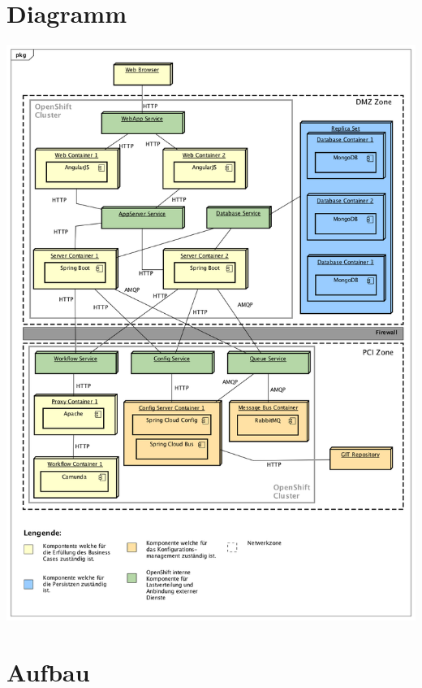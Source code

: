 \section{Diagramm}
\label{deploy-dia}
\begin{center}
	\includegraphics[scale=0.45]{OpenShiftDeployment.png}
\end{center}

\section{Aufbau}

